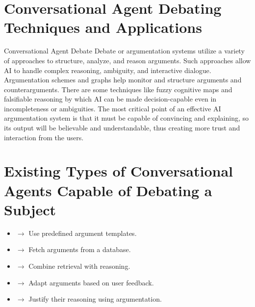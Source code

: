 \documentclass[12pt]{article}
\begin{document}
\section{Conversational Agent Debating Techniques and Applications}
\begin{small}
    Conversational Agent Debate Debate or argumentation systems utilize a variety of approaches to structure, analyze, and reason arguments. Such approaches allow AI to handle complex reasoning, ambiguity, and interactive dialogue. Argumentation schemes and graphs help monitor and structure arguments and counterarguments. There are some techniques like fuzzy cognitive maps and falsifiable reasoning by which AI can be made decision-capable even in incompleteness or ambiguities. The most critical point of an effective AI argumentation system is that it must be capable of convincing and explaining, so its output will be believable and understandable, thus creating more trust and interaction from the users.
\end{small}

\section{Existing Types of Conversational Agents Capable of Debating a Subject}
\begin{small}
    \begin{itemize}
        \item {} $\rightarrow$ Use predefined argument templates.
        \item {} $\rightarrow$ Fetch arguments from a database.
        \item {} $\rightarrow$ Combine retrieval with reasoning.
        \item {} $\rightarrow$ Adapt arguments based on user feedback.
        \item {} $\rightarrow$ Justify their reasoning using argumentation.
    \end{itemize}
\end{small}
\end{document}
